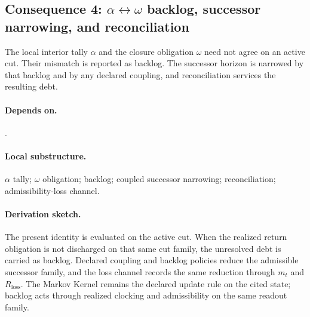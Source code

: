 \subsection{Consequence 4: \texorpdfstring{$\alpha\leftrightarrow\omega$}{alpha-omega} backlog, successor narrowing, and reconciliation}
\begin{consequence}\label{cons:c4}
The local interior tally $\alpha$ and the closure obligation $\omega$ need not agree on an active cut. Their mismatch is reported as backlog. The successor horizon is narrowed by that backlog and by any declared coupling, and reconciliation services the resulting debt.
\end{consequence}
\paragraph{Depends on.} .
\paragraph{Local substructure.} $\alpha$ tally; $\omega$ obligation; backlog; coupled successor narrowing; reconciliation; admissibility-loss channel.
\paragraph{Derivation sketch.} The present identity is evaluated on the active cut. When the realized return obligation is not discharged on that same cut family, the unresolved debt is carried as backlog. Declared coupling and backlog policies reduce the admissible successor family, and the loss channel records the same reduction through $m_t$ and $R_{\mathrm{loss}}$. The Markov Kernel remains the declared update rule on the cited state; backlog acts through realized clocking and admissibility on the same readout family.
